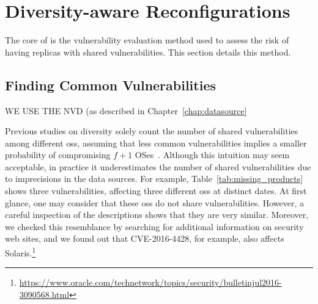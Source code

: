\section{Diversity-aware Reconfigurations}
\label{sec:metric}

The core of \system is the vulnerability evaluation method used to assess the risk of having replicas with shared vulnerabilities.
This section details this method.

\subsection{Finding Common Vulnerabilities}

WE USE THE NVD (as described in Chapter~\ref{chap:datasource}


Previous studies on diversity solely count the number of shared vulnerabilities among different \glspl{os}, assuming that less common vulnerabilities implies a smaller probability of compromising $f+1$ OSes~\cite{Garcia:2014}. 
Although this intuition may seem acceptable, in practice it underestimates the number of shared vulnerabilities due to imprecisions in the data sources. 
For example, Table~\ref{tab:missing_products} shows three vulnerabilities, affecting three different \glspl{os} at distinct dates.
At first glance, one may consider that these \glspl{os} do not share vulnerabilities.
However, a careful inspection of the descriptions shows that they are very similar.
Moreover, we checked this resemblance by searching for additional information on security web sites, and we found out that CVE-2016-4428, for example, also affects Solaris.\footnote{\url{https://www.oracle.com/technetwork/topics/security/bulletinjul2016-3090568.html}}

